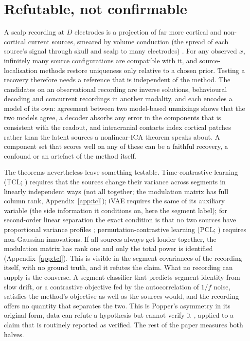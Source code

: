 \section{Refutable, not confirmable}
\label{sec:argument}

A scalp recording at $D$ electrodes is a projection of far more cortical and non-cortical current sources, smeared by volume conduction (the spread of each source's signal through skull and scalp to many electrodes) \citep{nunez2006electric,michel2019eeg}.
For any observed $x$, infinitely many source configurations are compatible with it, and source-localisation methods restore uniqueness only relative to a chosen prior.
Testing a recovery therefore needs a reference that is independent of the method.
The candidates on an observational recording are inverse solutions, behavioural decoding and concurrent recordings in another modality, and each encodes a model of its own: agreement between two model-based unmixings shows that the two models agree, a decoder absorbs any error in the components that is consistent with the readout, and intracranial contacts index cortical patches rather than the latent sources a nonlinear-ICA theorem speaks about.
A component set that scores well on any of these can be a faithful recovery, a confound or an artefact of the method itself.

The theorems nevertheless leave something testable.
Time-contrastive learning (TCL; \citealp{hyvarinen2016tcl}) requires that the sources change their variance across segments in linearly independent ways (not all together; the modulation matrix has full column rank, Appendix~\ref{app:tcl}); iVAE \citep{khemakhem2020ivae} requires the same of its auxiliary variable (the side information it conditions on, here the segment label); for second-order linear separation the exact condition is that no two sources have proportional variance profiles \citep{pham2001blind,kleinsteuber2013uniqueness}; permutation-contrastive learning (PCL; \citealp{hyvarinen2017pcl}) requires non-Gaussian innovations.
If all sources always get louder together, the modulation matrix has rank one and only the total power is identified (Appendix~\ref{app:tcl}).
This is visible in the segment covariances of the recording itself, with no ground truth, and it refutes the claim.
What no recording can supply is the converse.
A segment classifier that predicts segment identity from slow drift, or a contrastive objective fed by the autocorrelation of $1/f$ noise, satisfies the method's objective as well as the sources would, and the recording offers no quantity that separates the two.
This is Popper's asymmetry in its original form, data can refute a hypothesis but cannot verify it \citep{popper1959logic}, applied to a claim that is routinely reported as verified.
The rest of the paper measures both halves.
